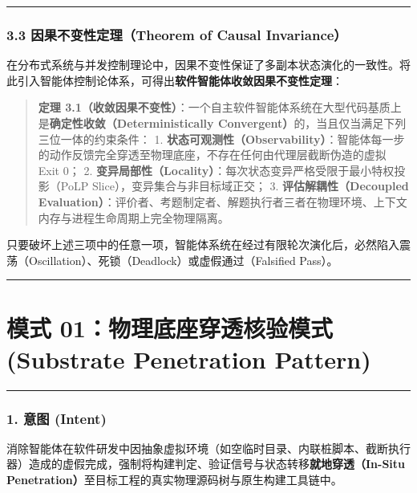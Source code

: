 \begin{center}\rule{0.5\linewidth}{0.5pt}\end{center}

\subsubsection{3.3 因果不变性定理（Theorem of Causal
Invariance）}\label{ux56e0ux679cux4e0dux53d8ux6027ux5b9aux7406theorem-of-causal-invariance}

在分布式系统与并发控制理论中，因果不变性保证了多副本状态演化的一致性。将此引入智能体控制论体系，可得出\textbf{软件智能体收敛因果不变性定理}：

\begin{quote}
\textbf{定理
3.1（收敛因果不变性）}：一个自主软件智能体系统在大型代码基质上是\textbf{确定性收敛（Deterministically
Convergent）}的，当且仅当满足下列三位一体的约束条件： 1.
\textbf{状态可观测性（Observability）}：智能体每一步的动作反馈完全穿透至物理底座，不存在任何由代理层截断伪造的虚拟
Exit 0； 2.
\textbf{变异局部性（Locality）}：每次状态变异严格受限于最小特权投影（PoLP
Slice），变异集合与非目标域正交； 3. \textbf{评估解耦性（Decoupled
Evaluation）}：评价者、考题制定者、解题执行者三者在物理环境、上下文内存与进程生命周期上完全物理隔离。
\end{quote}

只要破坏上述三项中的任意一项，智能体系统在经过有限轮次演化后，必然陷入震荡（Oscillation）、死锁（Deadlock）或虚假通过（Falsified
Pass）。

\begin{center}\rule{0.5\linewidth}{0.5pt}\end{center}

\section{模式 01：物理底座穿透核验模式 (Substrate Penetration
Pattern)}\label{ux6a21ux5f0f-01ux7269ux7406ux5e95ux5ea7ux7a7fux900fux6838ux9a8cux6a21ux5f0f-substrate-penetration-pattern}

\begin{center}\rule{0.5\linewidth}{0.5pt}\end{center}

\subsubsection{1. 意图 (Intent)}\label{ux610fux56fe-intent}

消除智能体在软件研发中因抽象虚拟环境（如空临时目录、内联桩脚本、截断执行器）造成的虚假完成，强制将构建判定、验证信号与状态转移\textbf{就地穿透（In-Situ
Penetration）}至目标工程的真实物理源码树与原生构建工具链中。

